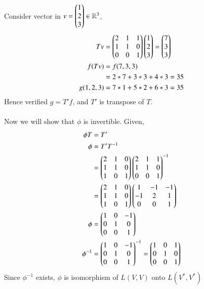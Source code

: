 Consider vector in $v = \begin{pmatrix}1\\2\\3\end{pmatrix} \in \mathbb{R}^3$,
\begin{align}
	Tv &= \begin{pmatrix}2 & 1 & 1\\ 1 & 1 & 0\\ 0 & 0 & 1\end{pmatrix}\begin{pmatrix}1\\2\\3\end{pmatrix} = \begin{pmatrix}7\\3\\3\end{pmatrix}\\
	f(Tv) &= f(7,3,3)\\
	 &= 2*7 + 3*3 + 4*3 = 35\\
	 g(1,2,3) &= 7*1 + 5*2 + 6*3 = 35 
\end{align}
Hence verified $g = T'f$, and $T'$ is transpose of $T$. \\
\\
Now we will show that $\phi$ is invertible. 
Given,
\begin{align}
	\phi T &= T'\\
	\phi &= T'T^{-1}\\
	&= \begin{pmatrix}2 & 1 & 0\\1 & 1 & 0\\1 & 0 & 1\end{pmatrix}\begin{pmatrix}2 & 1 & 1\\ 1 & 1 & 0\\ 0 & 0 & 1\end{pmatrix}^{-1}\\
	&= \begin{pmatrix}2 & 1 & 0\\1 & 1 & 0\\1 & 0 & 1\end{pmatrix}\begin{pmatrix}1 & -1 & -1\\-1 & 2 & 1\\0 & 0 & 1\end{pmatrix}\\
	\phi &= \begin{pmatrix}1 & 0 & -1\\0 & 1 & 0\\0 & 0 & 1\end{pmatrix}\\
	\phi^{-1} &= \begin{pmatrix}1 & 0 & -1\\0 & 1 & 0\\0 & 0 & 1\end{pmatrix}^{-1} = \begin{pmatrix}1 & 0 & 1\\0 & 1 & 0\\0 & 0 & 1\end{pmatrix}
\end{align}
Since $\phi^{-1}$ exists, $\phi$ is isomorphism of $L(V,V)$ onto $L(V^*,V^*)$
